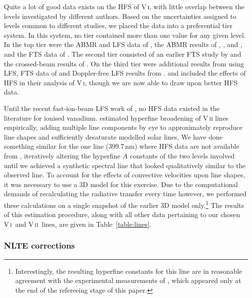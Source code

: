 \documentclass[traditabstract]{aa}
\newcommand{\altvi}{V\,\textsc{i}}
\newcommand{\altvii}{V\,\textsc{ii}}
\newcommand{\vi}{\altvi\ }
\newcommand{\vii}{\altvii\ }
\begin{document}
Quite a lot of good data exists on the HFS of V\,\textsc{i}, with little overlap between the levels investigated by
different authors.  Based on the uncertainties assigned to levels common to different studies, we placed the data into a
preferential tier system.  In this system, no tier contained more than one value for any given level.  In the top tier
were the ABMR and LFS data of \citet{Childs79}, the ABMR results of \citet{ElKashef92}, \citet{Unkel89}, \citet{Johann81}
and \citet{Childs67b}, and the FTS data of \citet{Palmeri97}.  The second tier consisted of an earlier FTS study by
\citet{Palmeri95} and the crossed-beam results of \citet{Cochrane98}.  On the third tier were additional results from
\citet{Unkel89} using LFS, FTS data of \citet{Lefebvre02} and Doppler-free LFS results from \citet{Gough85}.
\citet{Whaling85} and \citet{Biemont89} included the effects of HFS in their analysis of V\,\textsc{i}, though we are now
able to draw upon better HFS data.

Until the recent fast-ion-beam LFS work of \citet{Armstrong11}, no HFS data existed in the literature for ionised vanadium.  \citet{Biemont89} estimated hyperfine broadening
of V\,\textsc{ii} lines empirically, adding multiple line components by eye to approximately reproduce line shapes and sufficiently desaturate modelled solar lines.  We have done something similar for the one line (399.7\,nm) where HFS data are not available from \citet{Armstrong11}, iteratively altering the hyperfine $A$ constants of the two levels involved until we achieved a synthetic spectral line that looked qualitatively similar to the observed line.  To account for the effects of convective velocities upon line shapes, it was necessary to use a 3D model for this exercise.  Due to the computational demands of recalculating the radiative transfer every time however, we performed these calculations on a single snapshot of the earlier 3D model \citep{AspI} only.\footnote{Interestingly, the resulting hyperfine constants for this line are in reasonable agreement with the experimental measurements of \citet{Wood14V2}, which appeared only at the end of the refereeing stage of this paper.}
The results of this estimation procedure, along with all other data pertaining to our chosen \vi and \vii lines, are given in Table~\ref{table:lines}.

\subsubsection{NLTE corrections}
\label{VNLTE}
\end{document}
